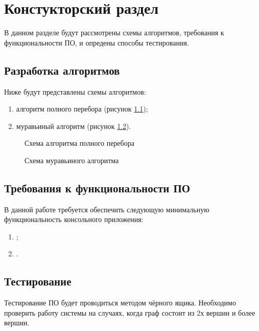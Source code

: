 \chapter{ Констукторский раздел}
\label{cha:design}
    В данном разделе будут рассмотрены схемы алгоритмов, требования к функциональности ПО,
    и опредены способы тестирования.
    
    \section{Разработка алгоритмов}
        Ниже будут представлены схемы алгоритмов: 
        \begin{enumerate}
            \item алгоритм полного перебора (рисунок \ref{schema:brute-force});
            \item муравьиный алгоритм (рисунок \ref{schema:ant}).
        \end{enumerate}

        \begin{figure}[h!]
            \centering
                \caption{Схема алгоритма полного перебора}
                \label{schema:brute-force}
        \end{figure}

        \begin{figure}[h!]
            \centering
                \caption{Схема муравьиного алгоритма}
                \label{schema:ant}
        \end{figure}

    \section{Требования к функциональности ПО}
        В данной работе требуется обеспечить следующую минимальную функциональность консольного приложения:
        \begin{enumerate}
            \item ;
            \item .
        \end{enumerate}

    \section{Тестирование}
        Тестирование ПО будет проводиться методом чёрного ящика. 
        Необходимо проверить работу системы на случаях,
        когда граф состоит из 2х вершин и более вершин.

\newpage